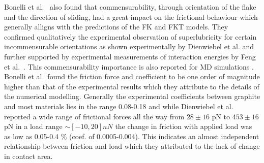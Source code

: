 Bonelli et al.\ \cite{bonelli_atomistic_2009} also found that commensurability,
through orientation of the flake and the direction of sliding, had a great impact on the frictional behaviour which generally alligns with the
predictions of the \acrshort{FK} and \acrshort{FKT} models. They confirmed qualitatively the experimental observation of superlubricity for certain incommensurable
orientations as shown experimentally by Dienwiebel et
al.\cite{DIENWIEBEL2005197} and further supported by experimental measurements
of interaction energies by Feng et al.\ \cite{feng_superlubric_2013}. This commensurability importance is also reported for \acrshort{MD} simulations \cite{ma12091425, zhu_study_2018, Wijn_2011}. Bonelli et al.\ found the friction force and coefficient to be one order of magnitude higher than that of the experimental results which they attribute to the details of the numerical modelling. Generally the experimental coefficients between graphite and most materials lies in the range 0.08-0.18 \cite{DIENWIEBEL2005197} and while Dienwiebel et al.\ \cite{DIENWIEBEL2005197}
reported a wide range of frictional forces all the way from $28 \pm 16$ pN to $453 \pm 16$ pN in a load range $\sim [-10, 20] nN$ the change in friction with applied load was as low as 0.05-0.4 \% (coef. of 0.0005-0.004). This indicates an almost independent relationship between friction and load which they attributed to the lack of change in contact area. 

